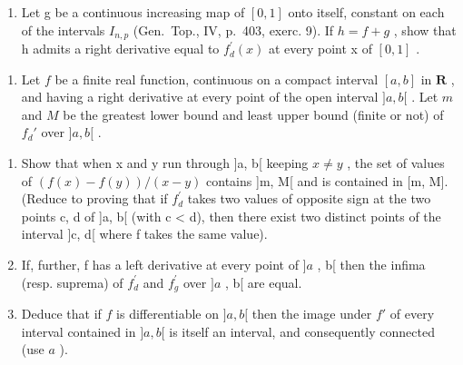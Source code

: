 \begin{enumerate}
\def\labelenumi{\alph{enumi})}
\setcounter{enumi}{1}
\tightlist
\item
  Let g be a continuous increasing map of \([0, 1]\) onto itself, constant on each of the intervals \(I_{n,p}\) (Gen.~Top., IV, p.~403, exerc. 9). If \(h = f + g\) , show that h admits a right derivative equal to \(f_{d}^{\prime}(x)\) at every point x of \([0, 1]\) .
\end{enumerate}

\begin{enumerate}
\def\labelenumi{\arabic{enumi})}
\setcounter{enumi}{3}
\tightlist
\item
  Let \(f\) be a finite real function, continuous on a compact interval \([a, b]\) in \(\mathbf{R}\) , and having a right derivative at every point of the open interval \(]a, b[\) . Let \(m\) and \(M\) be the greatest lower bound and least upper bound (finite or not) of \(f_d'\) over \(]a, b[\) .
\end{enumerate}

\begin{enumerate}
\def\labelenumi{\alph{enumi})}
\item
  Show that when x and y run through {]}a, b{[} keeping \(x \neq y\) , the set of values of \((f(x) - f(y))/(x - y)\) contains {]}m, M{[} and is contained in {[}m, M{]}. (Reduce to proving that if \(f_{d}^{\prime}\) takes two values of opposite sign at the two points c, d of {]}a, b{[} (with c \textless{} d), then there exist two distinct points of the interval {]}c, d{[} where f takes the same value).
\item
  If, further, f has a left derivative at every point of \(]a\) , b{[} then the infima (resp. suprema) of \(f_{d}^{\prime}\) and \(f_{g}^{\prime}\) over \(]a\) , b{[} are equal.
\item
  Deduce that if \(f\) is differentiable on \(]a, b[\) then the image under \(f'\) of every interval contained in \(]a, b[\) is itself an interval, and consequently connected (use \(a\) ).
\end{enumerate}

